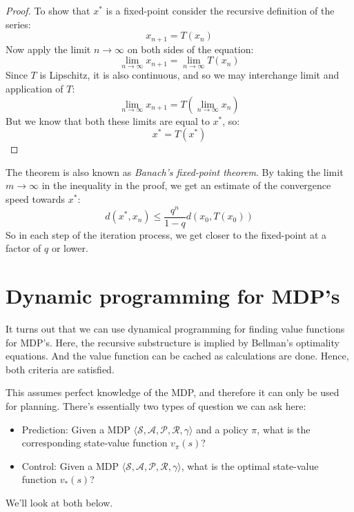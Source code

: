 \documentclass[12pt, a4paper]{article}
\numberwithin{equation}{section}
\begin{document}
\begin{proof}
To show that $x^*$ is a fixed-point consider the recursive definition of the series:
\begin{equation}
x_{n+1}=T(x_n)
\end{equation}
Now apply the limit $n\rightarrow\infty$ on both sides of the equation:
\begin{equation}
\lim_{n\rightarrow\infty} x_{n+1}=\lim_{n\rightarrow\infty}T(x_n)
\end{equation}
Since $T$ is Lipschitz, it is also continuous, and so we may interchange limit and application of $T$:
\begin{equation}
\lim_{n\rightarrow\infty} x_{n+1}=T\left(\lim_{n\rightarrow\infty}x_n\right)
\end{equation}
But we know that both these limits are equal to $x^*$, so:
\begin{equation}
x^*=T(x^*)
\end{equation}
\end{proof}

The theorem is also known as \textit{Banach's fixed-point theorem}. By taking the limit $m\rightarrow\infty$ in the inequality in the proof, we get an estimate of the convergence speed towards $x^*$:
\begin{equation}
d(x^*,x_n)\le\frac{q^n}{1-q}d(x_0,T(x_0))
\end{equation}
So in each step of the iteration process, we get closer to the fixed-point at a factor of $q$ or lower.

\section{Dynamic programming for MDP's}
It turns out that we can use dynamical programming for finding value functions for MDP's. Here, the recursive substructure is implied by Bellman's optimality equations. And the value function can be cached as calculations are done. Hence, both criteria are satisfied.

This assumes perfect knowledge of the MDP, and therefore it can only be used for planning. There's essentially two types of question we can ask here:
\begin{itemize}
\item Prediction: Given a MDP $\langle\mathcal{S},\mathcal{A},\mathcal{P},\mathcal{R},\gamma\rangle$ and a policy $\pi$, what is the corresponding state-value function $v_\pi(s)$?
\item Control: Given a MDP $\langle\mathcal{S},\mathcal{A},\mathcal{P},\mathcal{R},\gamma\rangle$, what is the optimal state-value function $v_*(s)$?
\end{itemize}
We'll look at both below.
\end{document}
